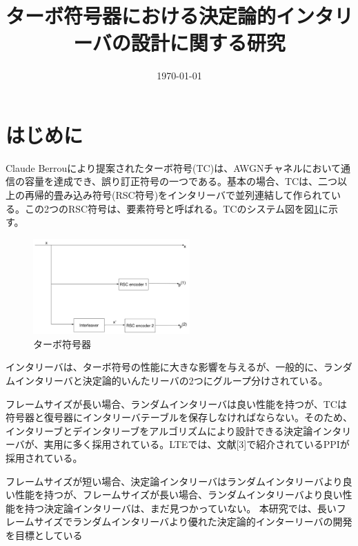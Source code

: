 \documentclass[twoside]{jarticle}
\title{ターボ符号器における決定論的インタリーバの設計に関する研究}
\date{\today}
\begin{document}
\MKTITLE

\section{はじめに}
Claude Berrouにより提案されたターボ符号(TC)は、AWGNチャネルにおいて通信の容量を達成でき、誤り訂正符号の一つである。基本の場合、TCは、二つ以上の再帰的畳み込み符号(RSC符号)をインタリーバで並列連結して作られている。この2つのRSC符号は、要素符号と呼ばれる。TCのシステム図を図\ref{TC}に示す。
\begin{center}
\begin{figure}[h!]
\includegraphics[width=6cm]{TurboEncoder.pdf}
\caption{ターボ符号器}
\label{TC}
\end{figure}
\end{center}
インタリーバは、ターボ符号の性能に大きな影響を与えるが、一般的に、ランダムインタリーバと決定論的いんたリーバの2つにグループ分けされている。

フレームサイズが長い場合、ランダムインタリーバは良い性能を持つが、TCは符号器と復号器にインタリーバテーブルを保存しなければならない。そのため、インタリーブとデインタリーブをアルゴリズムにより設計できる決定論インタリーバが、実用に多く採用されている。LTEでは、文献[3]で紹介されているPPIが採用されている。

フレームサイズが短い場合、決定論インタリーバはランダムインタリーバより良い性能を持つが、フレームサイズが長い場合、ランダムインタリーバより良い性能を持つ決定論インタリーバは、まだ見つかっていない。
本研究では、長いフレームサイズでランダムインタリーバより優れた決定論的インターリーバの開発を目標としている


\end{document}
